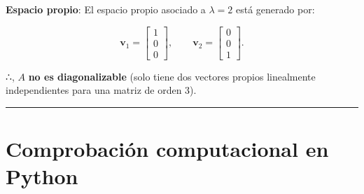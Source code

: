 \documentclass[
  letterpaper,
  DIV=11,
  numbers=noendperiod]{scrreprt}
\begin{document}
\textbf{Espacio propio}: El espacio propio asociado a \(\lambda = 2\)
está generado por:

\[
\mathbf{v}_1 =
\begin{bmatrix}
1\\
0\\
0
\end{bmatrix},
\qquad
\mathbf{v}_2 =
\begin{bmatrix}
0\\
0\\
1
\end{bmatrix}.
\]

∴, \(A\) \textbf{no es diagonalizable} (solo tiene dos vectores propios
linealmente independientes para una matriz de orden 3).

\begin{center}\rule{0.5\linewidth}{0.5pt}\end{center}

\section{Comprobación computacional en
Python}\label{comprobaciuxf3n-computacional-en-python}
\end{document}
